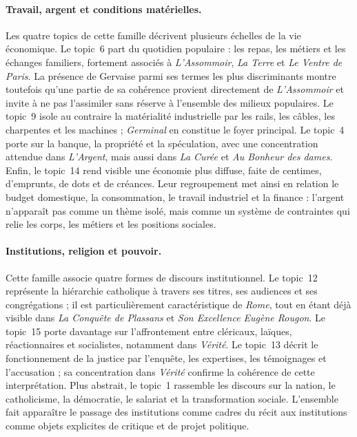 \paragraph{Travail, argent et conditions matérielles.} Les quatre topics de cette famille décrivent plusieurs échelles de la vie économique. Le topic~6 part du quotidien populaire : les repas, les métiers et les échanges familiers, fortement associés à \textit{L'Assommoir}, \textit{La Terre} et \textit{Le Ventre de Paris}. La présence de Gervaise parmi ses termes les plus discriminants montre toutefois qu'une partie de sa cohérence provient directement de \textit{L'Assommoir} et invite à ne pas l'assimiler sans réserve à l'ensemble des milieux populaires. Le topic~9 isole au contraire la matérialité industrielle par les rails, les câbles, les charpentes et les machines ; \textit{Germinal} en constitue le foyer principal. Le topic~4 porte sur la banque, la propriété et la spéculation, avec une concentration attendue dans \textit{L'Argent}, mais aussi dans \textit{La Curée} et \textit{Au Bonheur des dames}. Enfin, le topic~14 rend visible une économie plus diffuse, faite de centimes, d'emprunts, de dots et de créances. Leur regroupement met ainsi en relation le budget domestique, la consommation, le travail industriel et la finance : l'argent n'apparaît pas comme un thème isolé, mais comme un système de contraintes qui relie les corps, les métiers et les positions sociales.

\paragraph{Institutions, religion et pouvoir.} Cette famille associe quatre formes de discours institutionnel. Le topic~12 représente la hiérarchie catholique à travers ses titres, ses audiences et ses congrégations ; il est particulièrement caractéristique de \textit{Rome}, tout en étant déjà visible dans \textit{La Conquête de Plassans} et \textit{Son Excellence Eugène Rougon}. Le topic~15 porte davantage sur l'affrontement entre cléricaux, laïques, réactionnaires et socialistes, notamment dans \textit{Vérité}. Le topic~13 décrit le fonctionnement de la justice par l'enquête, les expertises, les témoignages et l'accusation ; sa concentration dans \textit{Vérité} confirme la cohérence de cette interprétation. Plus abstrait, le topic~1 rassemble les discours sur la nation, le catholicisme, la démocratie, le salariat et la transformation sociale. L'ensemble fait apparaître le passage des institutions comme cadres du récit aux institutions comme objets explicites de critique et de projet politique.

